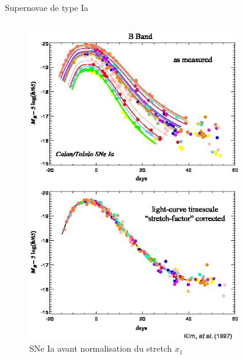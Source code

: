 \documentclass{beamer}
\begin{document}
\begin{frame}{Supernovae de type Ia}
\begin{columns}
\begin{column}{.5\textwidth}
	\begin{figure}
		\centering
		\includegraphics[width=.8\textwidth, trim={0 12cm 0 0}, clip]{figures/SNe-Ia-stretch.jpg}
		\caption{SNe Ia avant normalisation du stretch $x_1$}
	\end{figure}
\end{column}
\begin{column}{.5\textwidth}
	\begin{figure}
		\centering

\end{figure}
\end{column}
\end{columns}
\end{frame}
\end{document}
